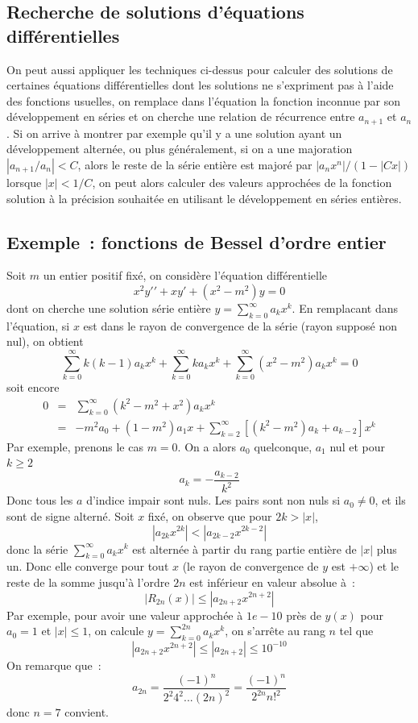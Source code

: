 \documentclass[a4paper,11pt]{book}
\begin{document}
\begin{giacjshere}
\subsection{Recherche de solutions d'\'equations diff\'erentielles}
On peut aussi appliquer les techniques ci-dessus pour calculer
des solutions de certaines \'equations diff\'erentielles dont les
solutions ne s'expriment pas \`a l'aide des fonctions usuelles,
on remplace dans l'\'equation la fonction inconnue par son 
d\'eveloppement en s\'eries et on cherche une relation de r\'ecurrence
entre $a_{n+1}$ et $a_n$. Si on arrive \`a montrer par exemple
qu'il y a une solution ayant un d\'eveloppement altern\'ee, 
ou plus g\'en\'eralement,
si on a une majoration $|a_{n+1}/a_n|<C$, alors le reste de la
s\'erie enti\`ere est major\'e par $|a_nx^n|/(1-|Cx|)$ lorsque
$|x|<1/C$, on peut alors calculer des valeurs approch\'ees
de la fonction solution \`a la pr\'ecision souhait\'ee en utilisant
le d\'eveloppement en s\'eries enti\`eres.

\subsection{Exemple~: fonctions de Bessel d'ordre entier}
Soit $m$ un entier positif fix\'e, on consid\`ere l'\'equation
diff\'erentielle
\[ x^2 y'{'} + x y' + (x^2-m^2)y=0 \]
dont on cherche une solution s\'erie enti\`ere 
$y=\sum_{k=0}^\infty a_k x^k $. En remplacant dans l'\'equation, si
$x$ est dans le rayon de convergence de la s\'erie (rayon suppos\'e
non nul), on obtient
\[ 
\sum_{k=0}^\infty k(k-1)a_k x^k + \sum_{k=0}^\infty k a_k x^k 
+ \sum_{k=0}^\infty (x^2-m^2) a_k x^k =0
\]
soit encore
\begin{eqnarray*}
0 &=& \sum_{k=0}^\infty (k^2-m^2+x^2) a_k x^k  \\
 &=& -m^2 a_0 + (1-m^2)a_1 x + \sum_{k=2}^\infty [(k^2-m^2) a_k +a_{k-2}]x^k 
\end{eqnarray*}
Par exemple, prenons le cas $m=0$. On a alors $a_0$ quelconque, $a_1$
nul et pour $k\geq 2$
\[ a_k = - \frac{a_{k-2}}{k^2}\]
Donc tous les $a$ d'indice impair sont nuls. Les pairs sont non nuls
si $a_0\neq 0$, et ils sont de signe altern\'e.
Soit $x$ fix\'e, on observe que pour $2k > |x|$,
\[ |a_{2k} x^{2k}| < |a_{2k-2} x^{2k-2}| \]
donc la s\'erie $\sum_{k=0}^\infty a_k x^k$ est altern\'ee \`a partir
du rang partie enti\`ere de $|x|$ plus un. Donc elle converge pour
tout $x$ (le rayon de convergence de $y$ est $+\infty$) 
et le reste de la somme jusqu'\`a l'ordre $2n$ est
inf\'erieur en valeur absolue \`a~:
\[ |R_{2n}(x)| \leq |a_{2n+2} x^{2n+2}| \]
Par exemple, pour avoir une valeur approch\'ee \`a $1e-10$ pr\`es de
$y(x)$ pour $a_0=1$ et $|x|\leq 1$, on calcule $y=\sum_{k=0}^{2n} a_k x^k $,
on s'arr\^ete au rang $n$ tel que 
\[ |a_{2n+2} x^{2n+2}| \leq |a_{2n+2}| \leq 10^{-10} \]
On remarque que~:
\[ a_{2n} = \frac{(-1)^n}{2^2 4^2 ... (2n)^2} = \frac{(-1)^n}{2^{2n} n!^2} \]
donc $n=7$ convient.


\end{giacjshere}
\end{document}
